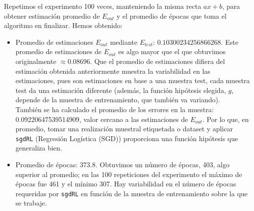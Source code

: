 \documentclass[11pt,a4paper]{article}
\theoremstyle{definition}
\begin{document}

	Repetimos el experimento 100 veces, manteniendo la misma recta $ax+b$, para obtener estimación promedio de $E_{out}$ y el promedio de épocas que toma el algoritmo en finalizar. Hemos obtenido:
	\begin{itemize}
		\item Promedio de estimaciones $E_{out}$ mediante $E_{test}$: $0.10300234256866268$. Este promedio de estimaciones de $E_{out}$ es algo mayor que el que obtuvimos originalmente $\approx 0.08696$. Que el promedio de estimaciones difiera del estimación obtenida anteriormente muestra la variabilidad en las estimaciones, pues son estimaciones en base a una muestra test, cada muestra test da una estimación diferente (además, la función hipótesis elegida, $g$, depende de la muestra de entrenamiento, que también va variando).\\
		También se ha calculado el promedio de los errores en la muestra: 0.09220647539514909, valor cercano a las estimaciones de $E_{out}$. Por lo que, en promedio, tomar una realización muestral etiquetada o dataset y aplicar \texttt{sgdRL} (Regresión Logística (SGD)) proporciona una función hipótesis que generaliza bien.%
		\item Promedio de épocas: $373.8$. Obtuvimos un número de épocas, 403, algo superior al promedio; en las 100 repeticiones del experimento el máximo de épocas fue 461 y el mínimo 307. Hay variabilidad en el número de épocas requeridas por \texttt{sgdRL} en función de la muestra de entrenamiento sobre la que se trabaje.
	\end{itemize}
	
\end{document}
